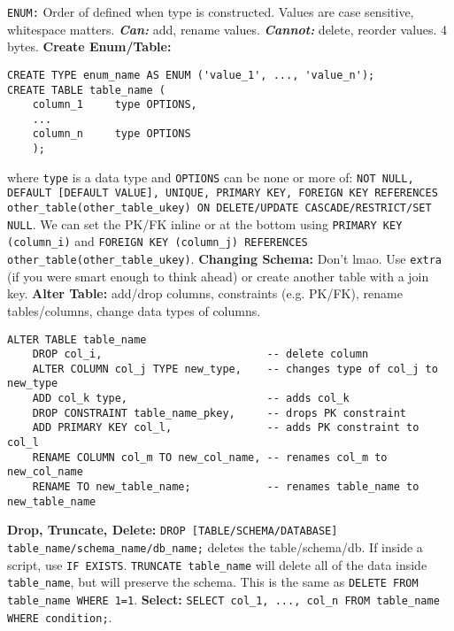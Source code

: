 \documentclass{report}
\renewcommand{\bf}[1]{\textbf{{#1}}}
\renewcommand{\tt}[1]{\texttt{{#1}}}
\newcommand{\ib}[1]{\textit{\textbf{{#1}}}}
\begin{document}
\tt{ENUM:} Order of defined when type is constructed. Values are case sensitive, whitespace
matters. \ib{Can:} add, rename values. \ib{Cannot:} delete, reorder values. 4 bytes.
\hfil \newline
\bf{Create Enum/Table:}
\vspace{-1em}
\begin{verbatim}
CREATE TYPE enum_name AS ENUM ('value_1', ..., 'value_n');
CREATE TABLE table_name (
    column_1     type OPTIONS,
    ...
    column_n     type OPTIONS
    );
\end{verbatim}
\vspace{-1em}
where \tt{type} is a data type and \tt{OPTIONS} can be none or more of: \tt{NOT NULL, DEFAULT
    [DEFAULT VALUE], UNIQUE, PRIMARY KEY, FOREIGN KEY REFERENCES other\_table(other\_table\_ukey) 
ON DELETE/UPDATE CASCADE/RESTRICT/SET NULL}. We can set the PK/FK inline or at the bottom 
using \tt{PRIMARY KEY (column\_i)} and \tt{FOREIGN KEY (column\_j) REFERENCES 
other\_table(other\_table\_ukey)}.
\hfil \newline
\bf{Changing Schema:} Don't lmao. Use \tt{extra} (if you were smart enough to think ahead) or
create another table with a join key.
\hfil \newline
\bf{Alter Table:} add/drop columns, constraints (e.g. PK/FK), rename tables/columns, change data
types of columns.
\vspace{-1em}
\begin{verbatim}
ALTER TABLE table_name
    DROP col_i,                          -- delete column
    ALTER COLUMN col_j TYPE new_type,    -- changes type of col_j to new_type
    ADD col_k type,                      -- adds col_k
    DROP CONSTRAINT table_name_pkey,     -- drops PK constraint
    ADD PRIMARY KEY col_l,               -- adds PK constraint to col_l
    RENAME COLUMN col_m TO new_col_name, -- renames col_m to new_col_name
    RENAME TO new_table_name;            -- renames table_name to new_table_name
\end{verbatim}
\vspace{-1em}
\bf{Drop, Truncate, Delete:} \tt{DROP [TABLE/SCHEMA/DATABASE] table\_name/schema\_name/db\_name;} 
deletes the table/schema/db. If inside a script, use \tt{IF EXISTS}. \tt{TRUNCATE table\_name}
will delete all of the data inside \tt{table\_name}, but will preserve the schema. This is the
same as \tt{DELETE FROM table\_name WHERE 1=1}.
\hfil \newline
\bf{Select:} \tt{SELECT col\_1, ..., col\_n FROM table\_name WHERE condition;}. 
\hfil \newline
\end{document}
